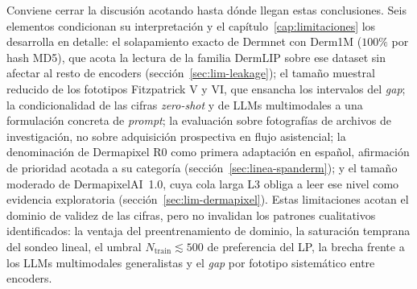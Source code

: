 Conviene cerrar la discusión acotando hasta dónde llegan estas
conclusiones. Seis elementos condicionan su interpretación y el
capítulo~\ref{cap:limitaciones} los desarrolla en detalle: el
solapamiento exacto de Dermnet con Derm1M ($100\%$ por hash MD5), que
acota la lectura de la familia DermLIP sobre ese dataset sin afectar al
resto de encoders (sección~\ref{sec:lim-leakage}); el tamaño muestral
reducido de los fototipos Fitzpatrick V y VI, que ensancha los
intervalos del \emph{gap}; la condicionalidad de las cifras
\emph{zero-shot} y de LLMs multimodales a una formulación concreta de
\emph{prompt}; la evaluación sobre fotografías de archivos de
investigación, no sobre adquisición prospectiva en flujo asistencial;
la denominación de Dermapixel R0 como primera adaptación en español,
afirmación de prioridad acotada a su categoría
(sección~\ref{sec:linea-spanderm}); y el tamaño moderado de
DermapixelAI~1.0, cuya cola larga L3 obliga a leer ese nivel como
evidencia exploratoria (sección~\ref{sec:lim-dermapixel}). Estas
limitaciones acotan el dominio de validez de las cifras, pero no
invalidan los patrones cualitativos identificados: la ventaja del
preentrenamiento de dominio, la saturación temprana del sondeo lineal,
el umbral $N_{\mathrm{train}} \lesssim 500$ de preferencia del LP, la
brecha frente a los LLMs multimodales generalistas y el \emph{gap} por
fototipo sistemático entre encoders.
